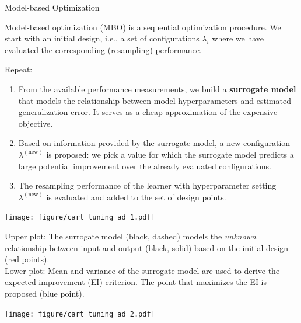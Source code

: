 \begin{vbframe}{Model-based Optimization}

Model-based optimization (MBO) is a sequential optimization procedure. We start with an initial design, i.e., a set of configurations $\lambda_i$ where we have evaluated the corresponding (resampling) performance. 

Repeat:
  \begin{enumerate}
\item From the available performance measurements, we build a \textbf{surrogate model} that models the relationship between model hyperparameters and estimated generalization error. It serves as a cheap approximation of the expensive objective. 
\item Based on information provided by the surrogate model, a new configuration $\lambda^{(\text{new})}$ is proposed: we pick a value for which the surrogate model predicts a large potential improvement over the already evaluated configurations.
\item The resampling performance of the learner with hyperparameter setting $\lambda^{(\text{new})}$ is evaluated and added to the set of design points.  
\end{enumerate}

\framebreak 

\begin{knitrout}\scriptsize
{}\color{fgcolor}

{\centering \texttt{[image: figure/cart\_tuning\_ad\_1.pdf]} 

}


\end{knitrout}
  
  \begin{footnotesize}
Upper plot: The surrogate model (black, dashed) models the \emph{unknown} relationship between input and output (black, solid) based on the initial design (red points).\\
Lower plot: Mean and variance of the surrogate model are used to derive the expected improvement (EI) criterion. The point that maximizes the EI is proposed (blue point). 
\end{footnotesize}

\framebreak 

\begin{knitrout}\scriptsize
{}\color{fgcolor}

{\centering \texttt{[image: figure/cart\_tuning\_ad\_2.pdf]} 
}



\end{knitrout}
\end{vbframe}
